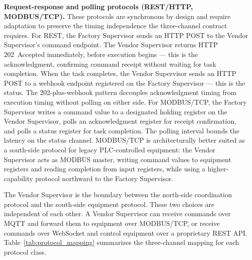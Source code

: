 \documentclass[a4paper,fleqn]{cas-dc}
\begin{document}
\textbf{Request-response and polling protocols (REST/HTTP, MODBUS/TCP).} These protocols are synchronous by design and require adaptation to preserve the timing independence the three-channel contract requires. For REST, the Factory Supervisor sends an HTTP POST to the Vendor Supervisor's command endpoint. The Vendor Supervisor returns HTTP 202~Accepted immediately, before execution begins — this is the acknowledgment, confirming command receipt without waiting for task completion. When the task completes, the Vendor Supervisor sends an HTTP POST to a webhook endpoint registered on the Factory Supervisor — this is the status. The 202-plus-webhook pattern decouples acknowledgment timing from execution timing without polling on either side. For MODBUS/TCP, the Factory Supervisor writes a command value to a designated holding register on the Vendor Supervisor, polls an acknowledgment register for receipt confirmation, and polls a status register for task completion. The polling interval bounds the latency on the status channel. MODBUS/TCP is architecturally better suited as a south-side protocol for legacy PLC-controlled equipment: the Vendor Supervisor acts as MODBUS master, writing command values to equipment registers and reading completion from input registers, while using a higher-capability protocol northward to the Factory Supervisor.

The Vendor Supervisor is the boundary between the north-side coordination protocol and the south-side equipment protocol. These two choices are independent of each other. A Vendor Supervisor can receive commands over MQTT and forward them to equipment over MODBUS/TCP, or receive commands over WebSocket and control equipment over a proprietary REST API. Table~\ref{tab:protocol_mapping} summarizes the three-channel mapping for each protocol class.
\end{document}
